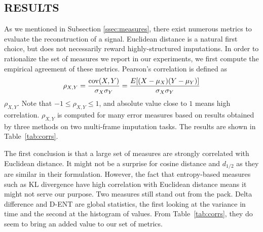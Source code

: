 \documentclass{article}
\begin{document}
\subsection{RESULTS}
\label{ssec:results}
As we mentioned in Subsection \ref{ssec:measures}, there exist
numerous metrics to evaluate the reconstruction of a signal. Euclidean
distance is a natural first choice, but does not necessarily reward
highly-structured imputations. In order to rationalize the set of
measures we report in our experiments, we first compute the empirical
agreement of these metrics.  Pearson's correlation is defined as
$$
\rho_{X,Y}={\mathrm{cov}(X,Y) \over \sigma_X
    \sigma_Y} ={E[(X-\mu_X)(Y-\mu_Y)] \over \sigma_X\sigma_Y}
$$
$\rho_{X,Y}$. Note that $-1 \leq \rho_{X,Y} \leq 1$, and absolute
value close to $1$ means high correlation. $\rho_{X,Y}$ is computed
for many error measures based on results obtained by three methods on
two multi-frame imputation tasks. The results are shown in
Table~\ref{tab:corrs}.

The first conclusion is that a large set of measures are strongly
correlated with Euclidean distance. It might not be a surprise for
cosine distance and $d_{1/2}$ as they are similar in their
formulation. However, the fact that entropy-based measures such as KL
divergence have high correlation with Euclidean distance means it
might not serve our purpose. Two measures still stand out from the
pack.  Delta difference and D-ENT are global statistics, the first
looking at the variance in time and the second at the histogram of
values. From Table~\ref{tab:corrs}, they do seem to bring an added
value to our set of metrics.
\end{document}
